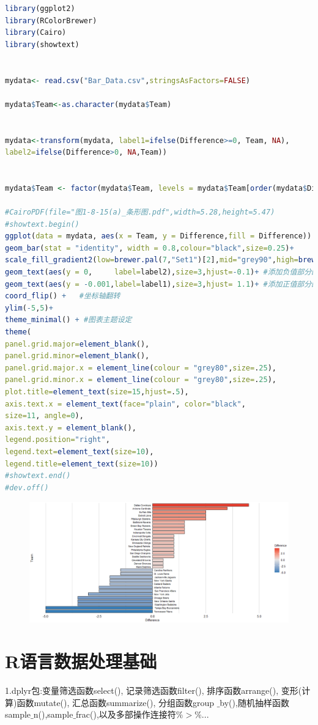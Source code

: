 \documentclass[11pt,a4paper,oneside]{book}
\begin{document}
\begin{lstlisting}[language=r]
library(ggplot2)
library(RColorBrewer)
library(Cairo)
library(showtext)


mydata<- read.csv("Bar_Data.csv",stringsAsFactors=FALSE)

mydata$Team<-as.character(mydata$Team)


mydata<-transform(mydata, label1=ifelse(Difference>=0, Team, NA),
label2=ifelse(Difference>0, NA,Team))


mydata$Team <- factor(mydata$Team, levels = mydata$Team[order(mydata$Difference)])

#CairoPDF(file="图1-8-15(a)_条形图.pdf",width=5.28,height=5.47) 
#showtext.begin()
ggplot(data = mydata, aes(x = Team, y = Difference,fill = Difference)) +
geom_bar(stat = "identity", width = 0.8,colour="black",size=0.25)+
scale_fill_gradient2(low=brewer.pal(7,"Set1")[2],mid="grey90",high=brewer.pal(7,"Set1")[1],midpoint=0)+
geom_text(aes(y = 0,     label=label2),size=3,hjust=-0.1)+ #添加负值部分的数据标签
geom_text(aes(y = -0.001,label=label1),size=3,hjust= 1.1)+ #添加正值部分的数据标签
coord_flip() +   #坐标轴翻转
ylim(-5,5)+
theme_minimal() + #图表主题设定
theme(
panel.grid.major=element_blank(),
panel.grid.minor=element_blank(),
panel.grid.major.x = element_line(colour = "grey80",size=.25),
panel.grid.minor.x = element_line(colour = "grey80",size=.25),
plot.title=element_text(size=15,hjust=.5),
axis.text.x = element_text(face="plain", color="black",
size=11, angle=0),
axis.text.y = element_blank(),
legend.position="right",
legend.text=element_text(size=10),
legend.title=element_text(size=10))
#showtext.end()
#dev.off()
\end{lstlisting}
\begin{figure}[H]
	\centering
	\includegraphics[width=\textwidth]{screenshot049}
\end{figure}

\chapter{R语言数据处理基础}
1.dplyr包:变量筛选函数select(), 记录筛选函数filter(), 排序函数arrange(), 变形(计算)函数mutate(), 汇总函数summarize(), 分组函数group $ \_ $by(),随机抽样函数sample$ \_ $n(),sample$ \_ $frac(),以及多部操作连接符$ \%>\% $...
\end{document}
